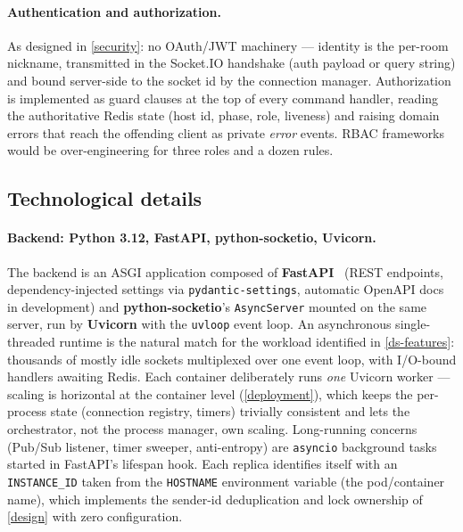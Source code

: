 \documentclass{scrartcl}
\begin{document}
\paragraph{Authentication and authorization.}
As designed in \cref{security}: no OAuth/JWT machinery --- identity is the
per-room nickname, transmitted in the Socket.IO handshake (auth payload or
query string) and bound server-side to the socket id by the connection
manager. Authorization is implemented as guard clauses at the top of every
command handler, reading the authoritative Redis state (host id, phase,
role, liveness) and raising domain errors that reach the offending client
as private \emph{error} events. RBAC frameworks would be
over-engineering for three roles and a dozen rules.

\subsection{Technological details}\label{technological-details}

\paragraph{Backend: Python 3.12, FastAPI, python-socketio, Uvicorn.}
The backend is an ASGI application composed of
\textbf{FastAPI}~\cite{fastapi} (REST endpoints, dependency-injected
settings via \texttt{pydantic-settings}, automatic OpenAPI docs in
development) and \textbf{python-socketio}'s \texttt{AsyncServer} mounted
on the same server, run by \textbf{Uvicorn} with the \texttt{uvloop} event
loop. An asynchronous single-threaded runtime is the natural match for
the workload identified in \cref{ds-features}: thousands of mostly idle
sockets multiplexed over one event loop, with I/O-bound handlers awaiting
Redis. Each container deliberately runs \emph{one} Uvicorn worker ---
scaling is horizontal at the container level (\cref{deployment}), which
keeps the per-process state (connection registry, timers) trivially
consistent and lets the orchestrator, not the process manager, own
scaling. Long-running concerns (Pub/Sub listener, timer sweeper,
anti-entropy) are \texttt{asyncio} background tasks started in FastAPI's
lifespan hook. Each replica identifies itself with an
\texttt{INSTANCE\_ID} taken from the \texttt{HOSTNAME} environment
variable (the pod/container name), which implements the sender-id
deduplication and lock ownership of \cref{design} with zero
configuration.
\end{document}
